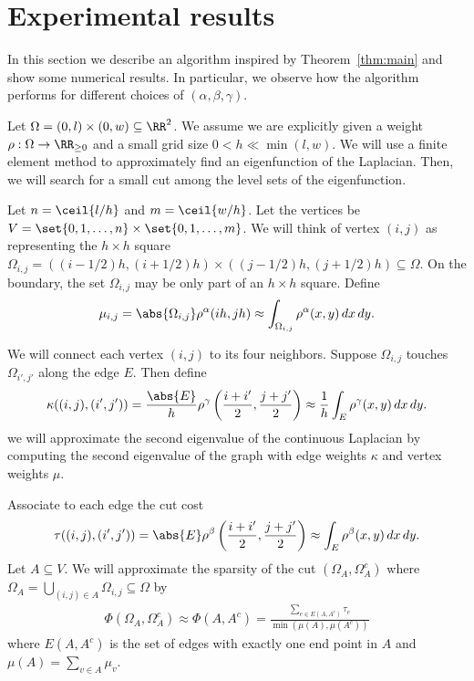 
\section{Experimental results}
\label{sec:experiments}
In this section we describe an algorithm inspired by Theorem~\ref{thm:main} and show some numerical results. In particular, we observe how the algorithm performs for different choices of $(\alpha,\beta,\gamma)$.

Let $\Omega=(0,l)\times(0,w)\subseteq\RR^2$. We assume we are
explicitly given a weight $\rho:\Omega\to\RR_{\geq 0}$ and a small grid size $0<h\ll \min(l,w)$. We will use a finite element method to approximately find an eigenfunction of the Laplacian. Then, we will search for a small cut among the level sets of the eigenfunction.

Let $n = \ceil{l/h}$ and $m=\ceil{w/h}$. Let the vertices be $V=\set{0,1,\dots,n}\times\set{0,1,\dots,m}$. We will think of vertex $(i,j)$ as representing the $h\times h$ square $\Omega_{i,j}=((i- 1/2) h, (i+1/2) h) \times ((j- 1/2) h, (j+1/2) h)\subseteq \Omega$. On the boundary, the set $\Omega_{i,j}$ may be only part of an $h\times h$ square. Define
\begin{align*}
\mu_{i,j}= \abs{\Omega_{i,j}}\rho^\alpha(ih, jh)\approx \int_{\Omega_{i,j}}\rho^\alpha(x,y)\,dx\,dy.
\end{align*}

We will connect each vertex $(i,j)$ to its four neighbors. Suppose $\Omega_{i,j}$ touches $\Omega_{i',j'}$ along the edge $E$. Then define
\begin{align*}
\kappa((i,j),(i',j')) = \frac{\abs{E}}{h} \rho^\gamma\left(\frac{i+i'}{2}, \frac{j+j'}{2}\right)\approx \frac{1}{h}\int_E \rho^\gamma(x,y)\,dx\,dy.
\end{align*}
we will approximate the second eigenvalue of the continuous Laplacian by computing the second eigenvalue of the graph with edge weights $\kappa$ and vertex weights $\mu$.

Associate to each edge the cut cost
\begin{align*}
\tau((i,j),(i',j')) = \abs{E} \rho^\beta\left(\frac{i+i'}{2}, \frac{j+j'}{2}\right)\approx \int_E \rho^\beta(x,y)\,dx\,dy.
\end{align*}
Let $A\subseteq V$.
We will approximate the sparsity of the cut $(\Omega_A,\Omega_A^c)$ where $\Omega_A = \bigcup_{(i,j)\in A} \Omega_{i,j}\subseteq \Omega$ by
\begin{align*}
\Phi(\Omega_A,\Omega_A^c) \approx \Phi(A, A^c) = \frac{\sum_{e\in E(A, A^c)} \tau_e}{\min(\mu(A),\mu(A^c))}
\end{align*}
where $E(A,A^c)$ is the set of edges with exactly one end point in $A$ and $\mu(A) = \sum_{v\in A} \mu_v$.

